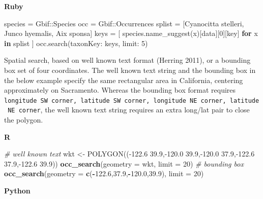 \documentclass[3p]{elsarticle} %
\newenvironment{Shaded}{\begin{snugshade}}{\end{snugshade}}
\newcommand{\CommentTok}[1]{\textcolor[rgb]{0.56,0.35,0.01}{\textit{#1}}}
\newcommand{\DataTypeTok}[1]{\textcolor[rgb]{0.13,0.29,0.53}{#1}}
\newcommand{\DecValTok}[1]{\textcolor[rgb]{0.00,0.00,0.81}{#1}}
\newcommand{\FloatTok}[1]{\textcolor[rgb]{0.00,0.00,0.81}{#1}}
\newcommand{\KeywordTok}[1]{\textcolor[rgb]{0.13,0.29,0.53}{\textbf{#1}}}
\newcommand{\NormalTok}[1]{#1}
\newcommand{\OperatorTok}[1]{\textcolor[rgb]{0.81,0.36,0.00}{\textbf{#1}}}
\newcommand{\StringTok}[1]{\textcolor[rgb]{0.31,0.60,0.02}{#1}}
\begin{document}
\textbf{Ruby}

\begin{Shaded}
\begin{Highlighting}[]
\NormalTok{species = }\DataTypeTok{Gbif}\NormalTok{::}\DataTypeTok{Species}
\NormalTok{occ = }\DataTypeTok{Gbif}\NormalTok{::}\DataTypeTok{Occurrences}
\NormalTok{splist = [}\StringTok{\textquotesingle{}Cyanocitta stelleri\textquotesingle{}}\NormalTok{, }\StringTok{\textquotesingle{}Junco hyemalis\textquotesingle{}}\NormalTok{, }\StringTok{\textquotesingle{}Aix sponsa\textquotesingle{}}\NormalTok{]}
\NormalTok{keys = [ species.name\_suggest(x)[}\StringTok{\textquotesingle{}data\textquotesingle{}}\NormalTok{][}\DecValTok{0}\NormalTok{][}\StringTok{\textquotesingle{}key\textquotesingle{}}\NormalTok{] }\KeywordTok{for}\NormalTok{ x }\KeywordTok{in}\NormalTok{ splist ]}
\NormalTok{occ.search(}\StringTok{taxonKey: }\NormalTok{keys, }\StringTok{limit: }\DecValTok{5}\NormalTok{)}
\end{Highlighting}
\end{Shaded}

Spatial search, based on well known text format (Herring 2011), or a
bounding box set of four coordinates. The well known text string and the
bounding box in the below example specify the same rectangular area in
California, centering approximately on Sacramento. Whereas the bounding
box format requires
\texttt{longitude\ SW\ corner,\ latitude\ SW\ corner,\ longitude\ NE\ corner,\ latitude\ NE\ corner},
the well known text string requires an extra long/lat pair to close the
polygon.

\textbf{R}

\begin{Shaded}
\begin{Highlighting}[]
\CommentTok{\# well known text}
\NormalTok{wkt <{-}}\StringTok{ \textquotesingle{}POLYGON(({-}122.6 39.9,{-}120.0 39.9,{-}120.0 37.9,{-}122.6 37.9,{-}122.6 39.9))\textquotesingle{}}
\KeywordTok{occ\_search}\NormalTok{(}\DataTypeTok{geometry =}\NormalTok{ wkt, }\DataTypeTok{limit =} \DecValTok{20}\NormalTok{)}
\CommentTok{\# bounding box}
\KeywordTok{occ\_search}\NormalTok{(}\DataTypeTok{geometry =} \KeywordTok{c}\NormalTok{(}\OperatorTok{{-}}\FloatTok{122.6}\NormalTok{,}\FloatTok{37.9}\NormalTok{,}\OperatorTok{{-}}\FloatTok{120.0}\NormalTok{,}\FloatTok{39.9}\NormalTok{), }\DataTypeTok{limit =} \DecValTok{20}\NormalTok{)}
\end{Highlighting}
\end{Shaded}

\textbf{Python}
\end{document}
